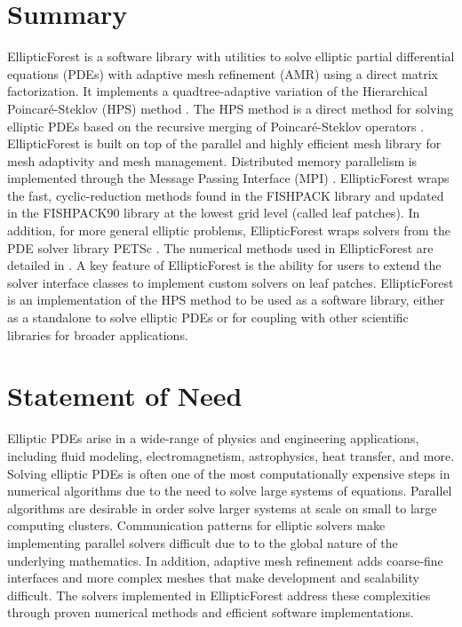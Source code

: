 \section{Summary}

EllipticForest is a software library with utilities to solve elliptic partial differential equations (PDEs) with adaptive mesh refinement (AMR) using a direct matrix factorization. It implements a quadtree-adaptive variation of the Hierarchical Poincaré-Steklov (HPS) method \citep{gillman2014direct}. The HPS method is a direct method for solving elliptic PDEs based on the recursive merging of Poincaré-Steklov operators \citep{quarteroni1991theory}. EllipticForest is built on top of the parallel and highly efficient mesh library  \citep{burstedde2011p4est} for mesh adaptivity and mesh management. Distributed memory parallelism is implemented through the Message Passing Interface (MPI) \citep{mpi40}. EllipticForest wraps the fast, cyclic-reduction methods found in the FISHPACK \citep{swarztrauber1999fishpack} library and updated in the FISHPACK90 \citep{adams2016fishpack90} library at the lowest grid level (called leaf patches). In addition, for more general elliptic problems, EllipticForest wraps solvers from the PDE solver library PETSc \citep{anl2023petsc}. The numerical methods used in EllipticForest are detailed in \citep{chipman2024fast}. A key feature of EllipticForest is the ability for users to extend the solver interface classes to implement custom solvers on leaf patches. EllipticForest is an implementation of the HPS method to be used as a software library, either as a standalone to solve elliptic PDEs or for coupling with other scientific libraries for broader applications.

\section{Statement of Need}

Elliptic PDEs arise in a wide-range of physics and engineering applications, including fluid modeling, electromagnetism, astrophysics, heat transfer, and more. Solving elliptic PDEs is often one of the most computationally expensive steps in numerical algorithms due to the need to solve large systems of equations. Parallel algorithms are desirable in order solve larger systems at scale on small to large computing clusters. Communication patterns for elliptic solvers make implementing parallel solvers difficult due to to the global nature of the underlying mathematics. In addition, adaptive mesh refinement adds coarse-fine interfaces and more complex meshes that make development and scalability difficult. The solvers implemented in EllipticForest address these complexities through proven numerical methods and efficient software implementations.

